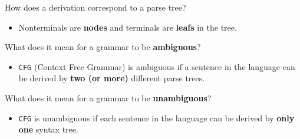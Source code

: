 \documentclass[11pt]{beamer}
\begin{document}
\begin{frame}


\begin{block}{How does a derivation correspond to a parse tree?}
\begin{itemize}
\item Nonterminals are \textbf{nodes} and terminals are \textbf{leafs} in the tree.
\end{itemize}
\end{block}


\begin{block}{What does it mean for a grammar to be \textbf{ambiguous}?}
\begin{itemize}
\item \texttt{CFG} (Context Free Grammar) is ambiguous if a sentence in the language can be derived by \textbf{two (or more)} different parse trees.
\end{itemize}
\end{block}


\begin{block}{What does it mean for a grammar to be \textbf{unambiguous}?}
\begin{itemize}
\item \texttt{CFG} is unambiguous if each sentence in the language can be derived by \textbf{only one} syntax tree.
\end{itemize}
\end{block}

\end{frame}
\end{document}
